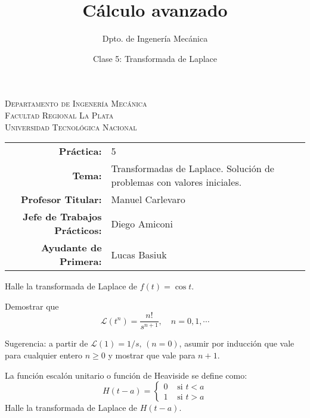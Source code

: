 \documentclass[11pt]{article}
\title{Cálculo avanzado}
\author{Dpto. de Ingenería Mecánica}
\date{Clase 5: Transformada de Laplace}
\begin{document}

\begin{center}
\end{center} 

\begin{center}
\vspace{\baselineskip}
\Large{\textsc{Departamento de Ingenería Mecánica}} \\
\textsc{Facultad Regional La Plata} \\
\textsc{Universidad Tecnológica Nacional}
\end{center}


\begin{center}
\begin{tabular}{r l}
    \textbf{Práctica:} & 5 \\
 \textbf{Tema:} & Transformadas de Laplace. Solución de problemas con valores iniciales.\\
 \textbf{Profesor Titular:} & Manuel Carlevaro \\
 \textbf{Jefe de Trabajos Prácticos:} & Diego Amiconi \\
 \textbf{Ayudante de Primera:} & Lucas Basiuk 
\end{tabular}\end{center}

\vspace{1em}

\begin{question} %
    Halle la transformada de Laplace de $f(t) = \cos t$.
\end{question}

\begin{question}
Demostrar que 
\[ \mathscr{L}(t^n) = \frac{n!}{s^{n + 1}}, \quad n = 0, 1, \cdots \] 

Sugerencia: a partir de $\mathscr{L}(1) = 1 / s, \, (n = 0)$, asumir por inducción que vale para cualquier entero $n \geq 0$ y mostrar que vale para $n + 1$.
\end{question}

\begin{question} %
La función escalón unitario o función de Heaviside se define como:
\[ H(t - a) = 
    \begin{cases}
    0 & \text{ si } t < a\\
    1 & \text{ si } t > a
    \end{cases}
\]
Halle la transformada de Laplace de $H(t - a)$.
\end{question}
\end{document}
